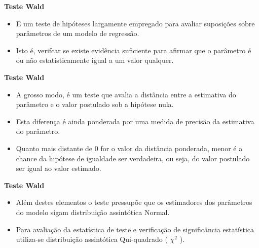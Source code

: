\documentclass[10pt,
  aspectratio=169,
  serif,
  mathserif,
  professionalfont,
  compress,
  handout,
  ]{beamer}\usepackage[]{graphicx}\usepackage[]{color}
\begin{document}
\begin{frame}[c, allowframebreaks]

\textbf{Teste Wald}

\begin{itemize}
  
  \item E um teste de hipóteses largamente empregado para avaliar suposições sobre parâmetros de um modelo de regressão.
  
  \item Isto é, verifcar se existe evidência suficiente para afirmar que o parâmetro é ou não estatísticamente igual a um valor qualquer. 
  
\end{itemize}

\end{frame}


\begin{frame}[c, allowframebreaks]

\textbf{Teste Wald}

\begin{itemize}

  \item A grosso modo, é um teste que avalia a distância entre a estimativa do parâmetro e o valor postulado sob a hipótese nula. 
  
  \item Esta diferença é ainda ponderada por uma medida de precisão da estimativa do parâmetro. 
  
  \item Quanto mais distante de 0 for o valor da distância ponderada, menor é a chance da hipótese de igualdade ser verdadeira, ou seja, do valor postulado ser igual ao valor estimado. 

\end{itemize}

\end{frame}


\begin{frame}[c, allowframebreaks]

\textbf{Teste Wald}

\begin{itemize}

\item Além destes elementos o teste pressupõe que os estimadores dos parâmetros do modelo sigam distribuição assintótica Normal.

\item Para avaliação da estatística de teste e verificação de significância estatística utiliza-se distribuição assintótica Qui-quadrado ( $\chi^2$ ).

\end{itemize}

\end{frame}
\end{document}
